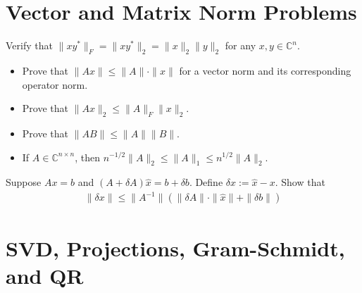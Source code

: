 \documentclass{ximera}
\begin{document}
\section{Vector and Matrix Norm Problems}
\begin{exercise}
    Verify that $\|xy^*\|_F = \|xy^*\|_2 = \|x\|_2\|y\|_2$ for any $x, y \in \mathbb{C}^n$.
\end{exercise}

\begin{exercise}
    \begin{itemize} 
    \item Prove that $\|Ax\| \leq \|A\|\cdot \|x\|$ for a vector norm and its corresponding operator norm.
    \item Prove that $\|Ax\|_2 \leq \|A\|_F\|x\|_2$.
    \item Prove that $\|AB\| \leq \|A\|\|B\|$.
    \item If $A \in \mathbb{C}^{n\times n}$, then $n^{-1/2}\|A\|_2 \leq \|A\|_1 \leq n^{1/2}\|A\|_2$.
    \end{itemize}
\end{exercise}

\begin{exercise}
    Suppose $Ax = b$ and  $(A+\delta A)\hat{x} = b+ \delta b$.  Define $\delta x := \hat{x} -x$.  Show that 
    \begin{align*}
        \|\delta x\| \leq \|A^{-1}\|(\|\delta A\| \cdot \|\hat{x}\| + \|\delta b\|)
    \end{align*}
\end{exercise}

\section{SVD, Projections, Gram-Schmidt, and QR}
\end{document}
